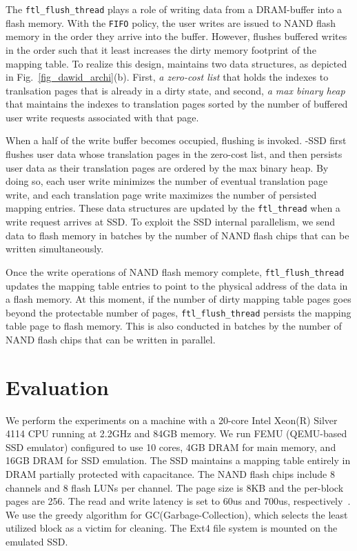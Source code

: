 The \texttt{ftl\_flush\_thread} plays a role of writing data from a DRAM-buffer
into a flash memory.  With the \texttt{FIFO} policy, the user writes are issued
to NAND flash memory in the order they arrive into the buffer. However, \ours{}
flushes buffered writes in the order such that it least increases the dirty memory
footprint of the mapping table.  To realize this design, \ours{} maintains two
data structures, as depicted in Fig.~\ref{fig_dawid_archi}(b). First, \textit{a
zero-cost list} that holds the indexes to tranlsation pages that is already
in a dirty state, and second, \textit{a max binary heap} that
maintains the indexes to translation pages sorted by the number of buffered
user write requests associated with that page.  

When a half of the write buffer becomes occupied, flushing is invoked. \ours{}-SSD
first flushes user data whose translation pages in the zero-cost list, and then
persists user data as their translation pages are ordered by the max binary
heap. By doing so, each user write minimizes the number of eventual
translation page write, and each translation page write maximizes the number of
persisted mapping entries. These data structures are updated by the \texttt{ftl\_thread} 
when a write request arrives at SSD. 
To exploit the SSD internal parallelism, we send data to flash memory in
batches by the number of NAND flash chips that can be written simultaneously.

Once the write operations of NAND flash memory complete,
\texttt{ftl\_flush\_thread} updates the mapping table entries to point to the
physical address of the data in a flash memory.  At this moment, if the number
of dirty mapping table pages goes beyond the protectable number of pages,
\texttt{ftl\_flush\_thread} persists the mapping table page to flash memory.
This is also conducted in batches by the number of NAND flash chips that can be
written in parallel.


\section{Evaluation}
We perform the experiments on a machine with a 20-core Intel Xeon(R) Silver
4114 CPU running at 2.2GHz and 84GB memory. We run FEMU (QEMU-based SSD
emulator) configured to use 10 cores, 4GB DRAM for main memory, and 16GB DRAM
for SSD emulation. The SSD maintains a mapping table entirely in DRAM partially
protected with capacitance. The NAND flash chips include 8 channels and 8 flash
LUNs per channel. The page size is 8KB and the per-block pages are 256. The
read and write latency is set to 60us and 700us,
respectively~\cite{cheong2018flash}. We use the greedy algorithm for
GC(Garbage-Collection), which selects the least utilized block as a victim for
cleaning. The Ext4 file system is mounted on the emulated SSD.  

